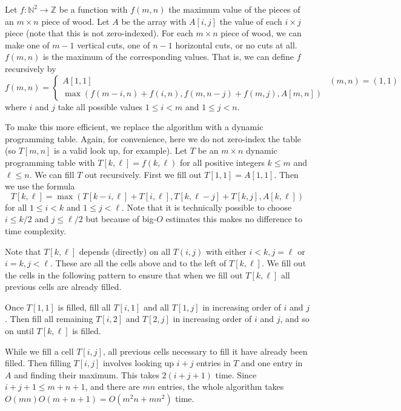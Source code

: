 \documentclass[12 pt, letterpaper]{hmcpset}
\begin{document}
\begin{solution}
	Let $f : \mathbb{N}^{2} \to \mathbb{Z}$ be a function with $f(m, n)$ the maximum value of the pieces of an $m \times n$ piece of wood. Let $A$ be the array with $A[i, j]$ the value of each $i \times j$ piece (note that this is not zero-indexed). For each $m \times n$ piece of wood, we can make one of $m - 1$ vertical cuts, one of $n - 1$ horizontal cuts, or no cuts at all. $f(m, n)$ is the maximum of the corresponding values. That is, we can define $f$ recursively by
	\[
		f(m, n) = \begin{cases}
			A[1, 1] & (m, n) = (1, 1) \\
			\max ( f(m - i, n) + f(i, n), f(m, n - j) + f(m, j), A[m, n])
		\end{cases}
	\]
	where $i$ and $j$ take all possible values $1 \le i < m$ and $1 \le j < n$. 

	To make this more efficient, we replace the algorithm with a dynamic programming table. Again, for convenience, here we do not zero-index the table (so $T[m, n]$ is a valid look up, for example). Let $T$ be an $m \times n$ dynamic programming table with $T[k, \ell] = f(k, \ell)$ for all positive integers $k \le m$ and $\ell \le n$. We can fill $T$ out recursively. First we fill out $T[1, 1] = A[1, 1]$. Then we use the formula
	\[
		T[k, \ell] = \max ( T[k - i, \ell] + T[i, \ell], T[k, \ell - j] + T[k, j], A[k, \ell])
	\]
	for all $1 \le i < k$ and $1 \le j < \ell$. Note that it is technically possible to choose $i \le k / 2$ and $j \le \ell / 2$ but because of big-$O$ estimates this makes no difference to time complexity.

	Note that $T[k, \ell]$ depends (directly) on all $T(i, j)$ with either $i < k, j = \ell$ or $i = k, j < \ell$. These are all the cells above and to the left of $T[k, \ell]$. We fill out the cells in the following pattern to ensure that when we fill out $T[k, \ell]$ all previous cells are already filled.

	Once $T[1, 1]$ is filled, fill all $T[i, 1]$ and all $T[1, j]$ in increasing order of $i$ and $j$. Then fill all remaining $T[i, 2]$ and $T[2, j]$ in increasing order of $i$ and $j$, and so on until $T[k, \ell]$ is filled. 

	While we fill a cell $T[i, j]$, all previous cells necessary to fill it have already been filled. Then filling $T[i, j]$ involves looking up $i + j$  entries in $T$ and one entry in $A$ and finding their maximum. This takes $2(i + j + 1)$ time. Since $i + j + 1 \le m + n + 1$, and there are $mn$ entries, the whole algorithm takes $O(mn) O(m + n + 1) = O(m^{2} n + m n^{2})$ time.


\end{solution}
\end{document}
